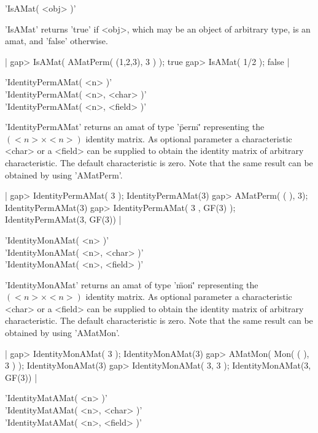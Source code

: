 %

'IsAMat( <obj> )'

'IsAMat'  returns  'true' if  <obj>,  which may  be  an object of
arbitrary type, is an amat, and  'false' otherwise. 

|    gap> IsAMat( AMatPerm( (1,2,3), 3 ) );
    true
    gap> IsAMat( 1/2 );
    false |


'IdentityPermAMat( <n> )'\\
'IdentityPermAMat( <n>, <char> )'\\
'IdentityPermAMat( <n>, <field> )'

'IdentityPermAMat' returns an amat of type '\"perm\"' representing
the $(<n>\times<n>)$ identity matrix. As optional parameter 
a characteristic <char> or a <field> can be supplied to obtain 
the identity matrix of arbitrary characteristic. 
The default characteristic is zero. Note that the same result
can be obtained by using 'AMatPerm'.

|    gap> IdentityPermAMat( 3 );
    IdentityPermAMat(3)
    gap> AMatPerm( ( ), 3);
    IdentityPermAMat(3)
    gap> IdentityPermAMat( 3 , GF(3) );
    IdentityPermAMat(3, GF(3)) |


'IdentityMonAMat( <n> )'\\
'IdentityMonAMat( <n>, <char> )'\\
'IdentityMonAMat( <n>, <field> )'

'IdentityMonAMat' returns an amat of type '\"mon\"' representing
the $(<n>\times<n>)$ identity matrix. As optional parameter 
a characteristic <char> or a <field> can be supplied to obtain 
the identity matrix of arbitrary characteristic. 
The default characteristic is zero. Note that the same result
can be obtained by using 'AMatMon'.

|    gap> IdentityMonAMat( 3 );         
    IdentityMonAMat(3)
    gap> AMatMon( Mon( ( ), 3 ) );
    IdentityMonAMat(3)
    gap> IdentityMonAMat( 3, 3 );
    IdentityMonAMat(3, GF(3)) |


'IdentityMatAMat( <n> )'\\
'IdentityMatAMat( <n>, <char> )'\\
'IdentityMatAMat( <n>, <field> )'

